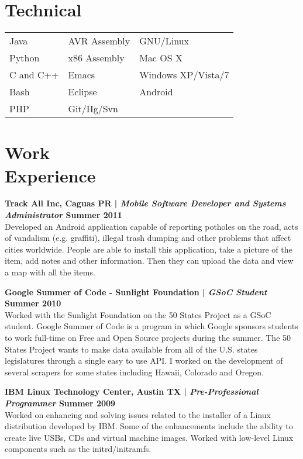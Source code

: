 \documentclass[margin,line]{res}
\begin{document}
\begin{resume}
\section{\sc Technical}
\begin{tabular}{@{}p{2in}p{2in}p{2in}}
 Java           & AVR Assembly  & GNU/Linux  \\            
Python   & x86 Assembly & Mac OS X   \\
C and C++ & Emacs & Windows XP/Vista/7 \\
Bash & Eclipse & Android \\
PHP & Git/Hg/Svn  & 
\end{tabular}

\section{\sc Work \\Experience}

{\bf Track All Inc, Caguas PR | {\em Mobile Software Developer and Systems Administrator} \hfill {\bf Summer 2011 \\} }
\vspace{-.01cm}
Developed an Android application capable of reporting potholes on the road, acts of vandalism (e.g. graffiti), illegal trash dumping and other problems that affect cities worldwide. People are able to install this application, take a picture of the item, add notes and other information. Then they can upload the data and view a map with all the items.

{\bf Google Summer of Code - Sunlight Foundation | {\em GSoC Student} \hfill {\bf Summer 2010 \\} }
\vspace{-.01cm}
Worked with the Sunlight Foundation on the 50 States Project as a GSoC student. Google Summer of Code is a program in which Google sponsors students to work full-time on Free and Open Source projects during the summer. The 50 States Project wants to make data available from all of the U.S. states legislatures through a single easy to use API. I worked on the development of several scrapers for some states including Hawaii, Colorado and Oregon.


{\bf IBM Linux Technology Center, Austin TX | {\em Pre-Professional Programmer} \hfill {\bf Summer 2009 \\} }
\vspace{-.01cm}
Worked on enhancing and solving issues related to the installer of a Linux distribution developed by IBM. Some of the enhancements include the ability to create live USBs, CDs and virtual machine images. Worked with low-level Linux components such as the initrd/initramfs.


\end{resume}
\end{document}
